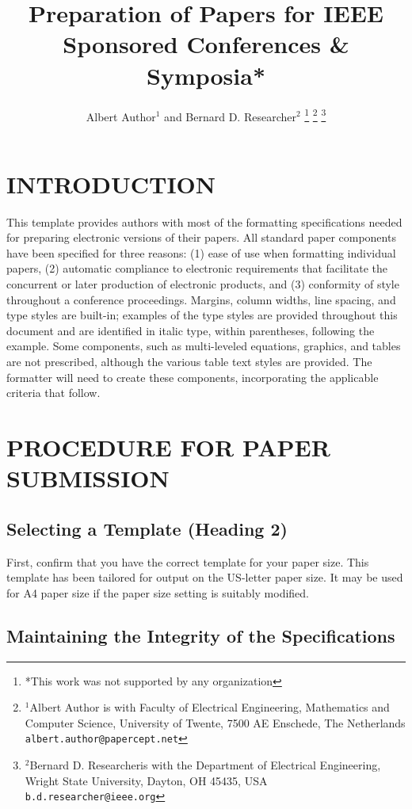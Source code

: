 \documentclass[a4paper, 10pt, conference]{ieeeconf}      %
\title{\LARGE \bf
Preparation of Papers for IEEE Sponsored Conferences \& Symposia*
}
\author{Albert Author$^{1}$ and Bernard D. Researcher$^{2}$%
\thanks{*This work was not supported by any organization}%
\thanks{$^{1}$Albert Author is with Faculty of Electrical Engineering, Mathematics and Computer Science,
        University of Twente, 7500 AE Enschede, The Netherlands
        {\tt\small albert.author@papercept.net}}%
\thanks{$^{2}$Bernard D. Researcheris with the Department of Electrical Engineering, Wright State University,
        Dayton, OH 45435, USA
        {\tt\small b.d.researcher@ieee.org}}%
}
\begin{document}
\maketitle
\thispagestyle{empty}
\pagestyle{empty}


\begin{abstract}


\end{abstract}


\section{INTRODUCTION}

This template provides authors with most of the formatting specifications needed for preparing electronic versions of their papers. All standard paper components have been specified for three reasons: (1) ease of use when formatting individual papers, (2) automatic compliance to electronic requirements that facilitate the concurrent or later production of electronic products, and (3) conformity of style throughout a conference proceedings. Margins, column widths, line spacing, and type styles are built-in; examples of the type styles are provided throughout this document and are identified in italic type, within parentheses, following the example. Some components, such as multi-leveled equations, graphics, and tables are not prescribed, although the various table text styles are provided. The formatter will need to create these components, incorporating the applicable criteria that follow.

\section{PROCEDURE FOR PAPER SUBMISSION}

\subsection{Selecting a Template (Heading 2)}

First, confirm that you have the correct template for your paper size. This template has been tailored for output on the US-letter paper size. 
It may be used for A4 paper size if the paper size setting is suitably modified.

\subsection{Maintaining the Integrity of the Specifications}
\end{document}
